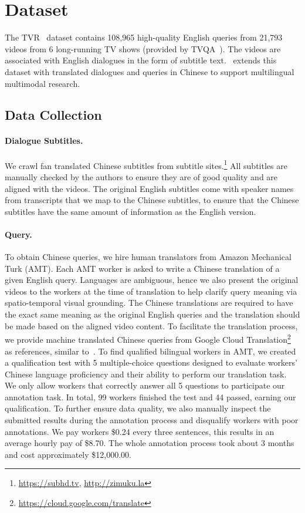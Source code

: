 \section{Dataset}\label{sec:dataset}
The TVR~\cite{lei2020tvr} dataset contains 108,965 high-quality English queries from 21,793 videos from 6 long-running TV shows (provided by TVQA~\cite{Lei2018TVQALC}). The videos are associated with English dialogues in the form of subtitle text. \DsetName~extends this dataset with translated dialogues and queries in Chinese to support multilingual multimodal research.



\subsection{Data Collection}

\paragraph{Dialogue Subtitles.}
We crawl fan translated Chinese subtitles from subtitle sites.\footnote{\url{https://subhd.tv}, \url{http://zimuku.la}} 
All subtitles are manually checked by the authors to ensure they are of good quality and are aligned with the videos.
The original English subtitles come with speaker names from transcripts that we map to the Chinese subtitles, to ensure that the Chinese subtitles have the same amount of information as the English version. 


\paragraph{Query.}
To obtain Chinese queries, we hire human translators from Amazon Mechanical Turk (AMT).
Each AMT worker is asked to write a Chinese translation of a given English query.
Languages are ambiguous, hence we also present the original videos to the workers at the time of translation to help clarify query meaning via spatio-temporal visual grounding. The Chinese translations are required to have the exact same meaning as the original English queries and the translation should be made based on the aligned video content.
To facilitate the translation process, we provide machine translated Chinese queries from Google Cloud Translation\footnote{\url{https://cloud.google.com/translate}} as references, similar to~\cite{wang2019vatex}. 
To find qualified bilingual workers in AMT, we created a qualification test with 5 multiple-choice questions designed to evaluate workers' Chinese language proficiency and their ability to perform our translation task.
We only allow workers that correctly answer all 5 questions to participate our annotation task.
In total, 99 workers finished the test and 44 passed, earning our qualification.
To further ensure data quality, we also manually inspect the submitted results during the annotation process and disqualify workers with poor annotations.
We pay workers \$0.24 every three sentences, this results in an average hourly pay of \$8.70. 
The whole annotation process took about 3 months and cost approximately \$12,000.00. 



